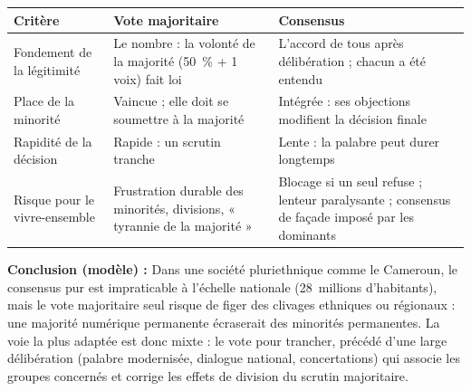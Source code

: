 \documentclass[11pt]{article}
\newcounter{popsec}
\newcounter{popsub}
\newcommand{\courssub}[1]{%
  \stepcounter{popsub}%
  \par\vspace{9pt}\noindent{\popxbold\fontsize{11.5}{13}\selectfont\color{popink}{\color{poporange}\thepopsec.\thepopsub}\hspace{6pt}#1}\par\nopagebreak\vspace{4pt}
}
\begin{document}
\begin{corrige}
\begin{center}
\begin{tabularx}{\linewidth}{|l|X|X|}\hline
\rowcolor{popblueL} \textbf{Critère} & \textbf{Vote majoritaire} & \textbf{Consensus} \\ \hline
Fondement de la légitimité & Le nombre : la volonté de la majorité (50~\% + 1 voix) fait loi & L'accord de tous après délibération ; chacun a été entendu \\ \hline
Place de la minorité & Vaincue ; elle doit se soumettre à la majorité & Intégrée : ses objections modifient la décision finale \\ \hline
Rapidité de la décision & Rapide : un scrutin tranche & Lente : la palabre peut durer longtemps \\ \hline
Risque pour le vivre-ensemble & Frustration durable des minorités, divisions, « tyrannie de la majorité » & Blocage si un seul refuse ; lenteur paralysante ; consensus de façade imposé par les dominants \\ \hline
\end{tabularx}
\end{center}
\textbf{Conclusion (modèle) :} Dans une société pluriethnique comme le Cameroun, le consensus pur est impraticable à l'échelle nationale (28~millions d'habitants), mais le vote majoritaire seul risque de figer des clivages ethniques ou régionaux : une majorité numérique permanente écraserait des minorités permanentes. La voie la plus adaptée est donc mixte : le vote pour trancher, précédé d'une large délibération (palabre modernisée, dialogue national, concertations) qui associe les groupes concernés et corrige les effets de division du scrutin majoritaire.
\end{corrige}

\courssub{Je me prépare au Bac}
\end{document}
